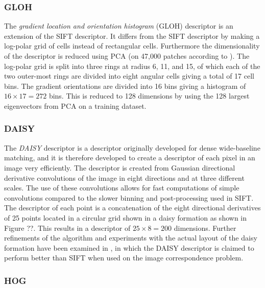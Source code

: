 \documentclass[thesis.tex]{subfiles}
\begin{document}
\subsubsection{GLOH}

The \emph{gradient location and orientation histogram} (GLOH) descriptor
\cite{mikolajczyk2005performance} is an extension of the SIFT descriptor.
It differs from the SIFT descriptor by making a log-polar grid of
cells instead of rectangular cells. Furthermore the dimensionality of
the descriptor is reduced using PCA (on 47,000 patches according to
\cite{mikolajczyk2005performance}). The log-polar grid is split into three
rings at radius 6, 11, and 15, of which each of the two outer-most rings are
divided into eight angular cells giving a total of 17 cell bins. The gradient
orientations are divided into 16 bins giving a histogram of $16 \times 17
= 272$ bins. This is reduced to 128 dimensions by using the 128 largest
eigenvectors from PCA on a training dataset.

\subsubsection{DAISY}

The \emph{DAISY} descriptor \cite{tola2008fast} is a descriptor originally
developed for dense wide-baseline matching, and it is therefore developed
to create a descriptor of each pixel in an image very efficiently. The
descriptor is created from Gaussian directional derivative convolutions of
the image in eight directions and at three different scales. The use of these
convolutions allows for fast computations of simple convolutions compared
to the slower binning and post-processing used in SIFT. The descriptor of
each point is a concatenation of the eight directional derivatives of 25
points located in a circular grid shown in a daisy formation as shown in
Figure ??. This results in a descriptor of
$25 \times 8 = 200$ dimensions. Further refinements of the algorithm and
experiments with the actual layout of the daisy formation have been examined
in \cite{winder2009picking}, in which the DAISY descriptor is claimed to perform
better than SIFT when used on the image correspondence problem.

\subsubsection{HOG}
\end{document}
